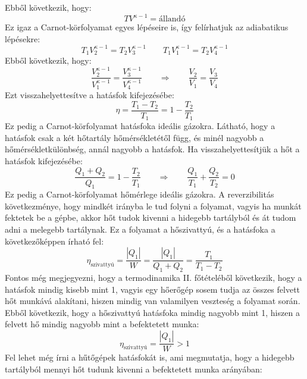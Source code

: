\documentclass[a4paper,12pt]{article}
\begin{document}
Ebből következik, hogy:
\begin{equation}
    T V^{\kappa - 1} = \text{állandó}
\end{equation}
Ez igaz a Carnot-körfolyamat egyes lépéseire is, így felírhatjuk az adiabatikus lépésekre:
\begin{equation}
    T_1 V_2^{\kappa - 1} = T_2 V_3^{\kappa - 1} \qquad T_1 V_1^{\kappa - 1} = T_2 V_4^{\kappa - 1}
\end{equation}
Ebből következik, hogy:
\begin{equation}
    \frac{V_2^{\kappa - 1}}{V_1^{\kappa - 1}} = \frac{V_3^{\kappa - 1}}{V_4^{\kappa - 1}} \qquad \Rightarrow \qquad \frac{V_2}{V_1} = \frac{V_3}{V_4}
\end{equation}
Ezt visszahelyettesítve a hatásfok kifejezésébe:
\begin{equation}
    \eta = \frac{T_1 - T_2}{T_1} = 1 - \frac{T_2}{T_1}
\end{equation}
Ez pedig a Carnot-körfolyamat hatásfoka ideális gázokra. Látható, hogy a hatásfok csak a két hőtartály hőmérsékletétől függ, és minél nagyobb a hőmérsékletkülönbség, annál nagyobb a hatásfok.
Ha visszahelyettesítjük a hőt a hatásfok kifejezésébe:
\begin{equation}
    \frac{Q_1 + Q_2}{Q_1} = 1 - \frac{T_2}{T_1} \qquad \Rightarrow \qquad \boxed{\frac{Q_1}{T_1} + \frac{Q_2}{T_2} = 0}
\end{equation}
Ez pedig a Carnot-körfolyamat hőmérlege ideális gázokra.
A reverzibilitás következménye, hogy mindkét irányba le tud folyni a folyamat, vagyis ha munkát fektetek be a gépbe, akkor hőt tudok kivenni a hidegebb tartályból és át tudom adni a melegebb tartálynak.
Ez a folyamat a hőszivattyú, és a hatásfoka a következőképpen írható fel:
\begin{equation}
    \eta_{\text{szivattyú}} = \frac{|Q_1|}{W} = \frac{|Q_1|}{Q_1 + Q_2} = \frac{T_1}{T_1 - T_2}
\end{equation}
Fontos még megjegyezni, hogy a termodinamika II. főtételéből következik, hogy a hatásfok mindig kisebb mint 1, vagyis egy hőerőgép sosem tudja az összes felvett hőt munkává alakítani, hiszen mindig van valamilyen veszteség a folyamat során.
Ebből következik, hogy a hőszivattyú hatásfoka mindig nagyobb mint 1, hiszen a felvett hő mindig nagyobb mint a befektetett munka:
\begin{equation}
    \eta_{\text{szivattyú}} = \frac{|Q_1|}{W} > 1
\end{equation}
Fel lehet még írni a hűtőgépek hatásfokát is, ami megmutatja, hogy a hidegebb tartályból mennyi hőt tudunk kivenni a befektetett munka arányában:
\end{document}
